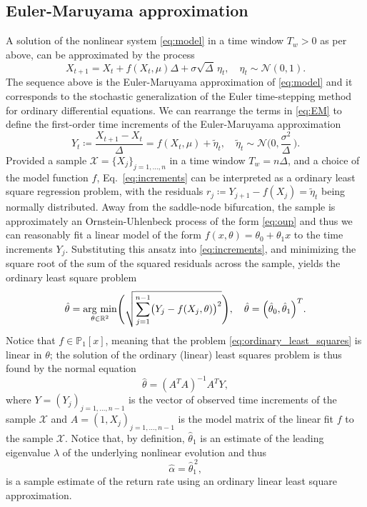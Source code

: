\documentclass[11pt,a4paper]{article}
\theoremstyle{plain}
\theoremstyle{definition}
\theoremstyle{remark}
\DeclareMathOperator*{\argmin}{\arg\,min}
\begin{document}
\subsection{Euler-Maruyama approximation}\label{subsec:LLS}
A solution of the nonlinear system \eqref{eq:model} in a time window $T_w>0$ as per above, can be approximated by the process \cite[\S~$8.4$]{Lord2014}
%
\begin{equation}\label{eq:EM}
        X_{t+1} = X_t + f(X_t,\mu)\Delta + \sigma\sqrt{\Delta}\,\eta_t , \quad \eta_t\sim\mathcal{N}(0,1) .
\end{equation}
%
The sequence above is the Euler-Maruyama approximation of \eqref{eq:model} and it corresponds to the stochastic generalization of the Euler time-stepping method for ordinary differential equations.
We can rearrange the terms in \eqref{eq:EM} to define the first-order time increments of the Euler-Maruyama approximation
%
\begin{equation}\label{eq:increments}
        Y_t\coloneqq\frac{X_{t+1} - X_t}{\Delta} = f(X_t,\mu) + \tilde{\eta}_t , \quad \tilde{\eta}_t\sim\mathcal{N}\biggl(0,\frac{\sigma^2}{\Delta}\,\biggr) .
\end{equation}
%
Provided a sample $\mathcal{X} = \{X_j\}_{j=1,\dots,n}$ in a time window $T_w=n\Delta$, and a choice of the model function $f$, Eq.~\eqref{eq:increments} can be interpreted as a ordinary least square regression problem, with the residuals $r_j\coloneqq Y_{j+1} - f(X_j)=\tilde{\eta}_t$ being normally distributed.
Away from the saddle-node bifurcation, the sample is approximately an Ornstein-Uhlenbeck process of the form \eqref{eq:oup} and thus we can reasonably fit a linear model of the form $f(x,\theta) = \theta_0 + \theta_1 x$ to the time increments $Y_j$.
Substituting this ansatz into \eqref{eq:increments}, and minimizing the square root of the sum of the squared residuals across the sample, yields the ordinary least square problem
%
\begin{equation}\label{eq:ordinary_least_squares}
        \hat\theta = \argmin_{\theta\in\mathbb{R}^2}\Biggl(\sqrt{\sum_{j=1}^{n-1}\bigl(Y_j-f(X_j,\theta)\bigr)^2}\Biggr) , \quad \hat{\theta} = \Bigl(\hat{\theta}_0, \hat{\theta}_1\Bigr)^T.
\end{equation}
%
Notice that $f\in\mathbb{P}_1[x]$, meaning that the problem \eqref{eq:ordinary_least_squares} is linear in $\theta$; the solution of the ordinary (linear) least squares problem is thus found by the normal equation
%
\begin{equation}\label{eq:normal_equation}
        \hat\theta = (A^TA)^{-1}A^TY,
\end{equation}
%
where $Y=(Y_j)_{j=1,\dots,n-1}$ is the vector of observed time increments of the sample $\mathcal{X}$ and $A=(1, X_j)_{j=1,\dots,n-1}$ is the model matrix of the linear fit $f$ to the sample $\mathcal{X}$.
Notice that, by definition, $\hat{\theta}_1$ is an estimate of the leading eigenvalue $\lambda$ of the underlying nonlinear evolution and thus
%
\begin{equation}\label{eq:LLS}
        \hat\alpha = \hat{\theta}_1^{\,2},
\end{equation}
%
is a sample estimate of the return rate using an ordinary linear least square approximation. 
\end{document}
